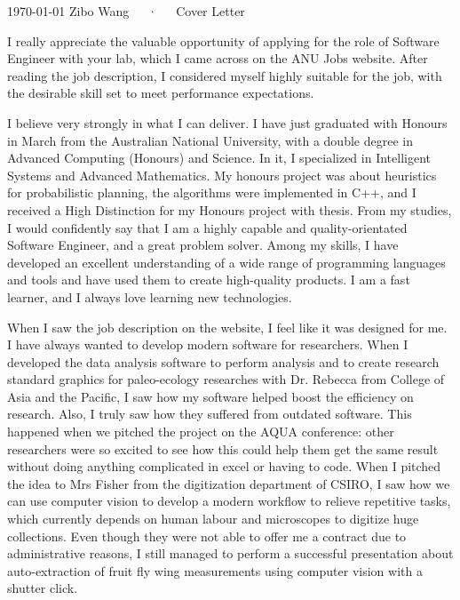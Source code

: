 \documentclass[11pt, a4paper]{awesome-cv}
\begin{document}
\makecvheader[R]

\makecvfooter
  {\today}
  {Zibo Wang~~~·~~~Cover Letter}
  {}

\makelettertitle

\begin{cvletter}

I really appreciate the valuable opportunity of applying for the role of Software Engineer with your lab, which I came across on the ANU Jobs website. After reading the job description, I considered myself highly suitable for the job, with the desirable skill set to meet performance expectations.


I believe very strongly in what I can deliver. I have just graduated with Honours in March from the Australian National University, with a double degree in Advanced Computing (Honours) and Science. In it, I specialized in Intelligent Systems and Advanced Mathematics. My honours project was about heuristics for probabilistic planning, the algorithms were implemented in C++, and I received a High Distinction for my Honours project with thesis. From my studies, I would confidently say that I am a highly capable and quality-orientated Software Engineer, and a great problem solver. Among my skills, I have developed an excellent understanding of a wide range of programming languages and tools and have used them to create high-quality products. I am a fast learner, and I always love learning new technologies. 

When I saw the job description on the website, I feel like it was designed for me. I have always wanted to develop modern software for researchers. When I developed the data analysis software to perform analysis and to create research standard graphics for paleo-ecology researches with Dr. Rebecca from College of Asia and the Pacific, I saw how my software helped boost the efficiency on research. Also, I truly saw how they suffered from outdated software. This happened when we pitched the project on the AQUA conference: other researchers were so excited to see how this could help them get the same result without doing anything complicated in excel or having to code. When I pitched the idea to Mrs Fisher from the digitization department of CSIRO, I saw how we can use computer vision to develop a modern workflow to relieve repetitive tasks, which currently depends on human labour and microscopes to digitize huge collections. Even though they were not able to offer me a contract due to administrative reasons, I still managed to perform a successful presentation about auto-extraction of fruit fly wing measurements using computer vision with a shutter click.


\end{cvletter}
\end{document}
